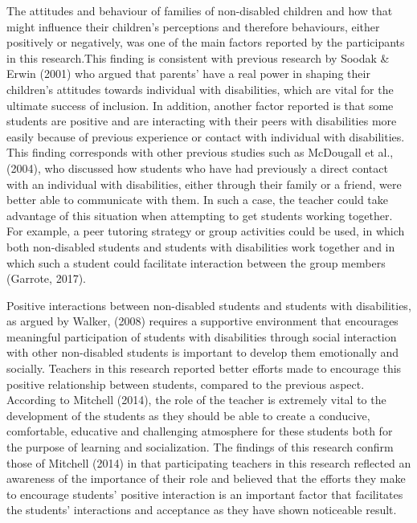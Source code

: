 \documentclass[11.5pt]{sig-alternate}
\begin{document}
\begin{large}
The attitudes and behaviour of families of non-disabled children and how that might influence their children’s perceptions and therefore behaviours, either positively or negatively, was one of the main factors reported by the participants in this research.This finding is consistent with previous research by Soodak \& Erwin (2001) who argued that parents’ have a real power in shaping their children’s attitudes towards individual with disabilities, which are vital for the ultimate success of inclusion. In addition, another factor reported is that some students are positive and are interacting with their peers with disabilities more easily because of previous experience or contact with individual with disabilities. This finding corresponds with other previous studies such as McDougall et al., (2004), who discussed how students who have had previously a direct contact with an individual with disabilities, either through their family or a friend, were better able to communicate with them. In such a case, the teacher could take advantage of this situation when attempting to get students working together. For example, a peer tutoring strategy or group activities could be used, in which both non-disabled students and students with disabilities work together and in which such a student could facilitate interaction between the group members (Garrote, 2017). 

Positive interactions between non-disabled students and students with disabilities, as argued by Walker, (2008) requires a supportive environment that encourages meaningful participation of students with disabilities through social interaction with other non-disabled students is important to develop them emotionally and socially.  Teachers in this research reported better efforts made to encourage this positive relationship between students, compared to the previous aspect. According to Mitchell (2014), the role of the teacher is extremely vital to the development of the students as they should be able to create a conducive, comfortable, educative and challenging atmosphere for these students both for the purpose of learning and socialization. The findings of this research confirm those of Mitchell (2014) in that participating teachers in this research reflected an awareness of the importance of their role and believed that the efforts they make to encourage students’ positive interaction is an important factor that facilitates the students’ interactions and acceptance as they have shown noticeable result.


\end{large}
\end{document}
